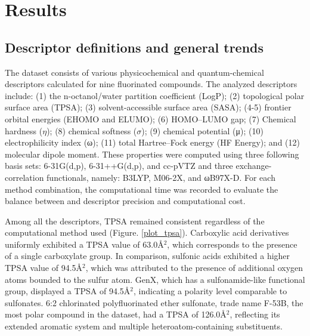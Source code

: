 
\chapter{Results}

\label{Chapter5}


\newcommand{\keyword}[1]{\textbf{#1}}
\newcommand{\tabhead}[1]{\textbf{#1}}
\newcommand{\code}[1]{\texttt{#1}}
\newcommand{\file}[1]{\texttt{\bfseries#1}}
\newcommand{\option}[1]{\texttt{\itshape#1}}
\renewcommand{\figurename}{Figure.}
\renewcommand{\tablename}{Table.}


\section{Descriptor definitions and general trends}

The dataset consists of various physicochemical and quantum-chemical descriptors calculated for nine fluorinated compounds. The analyzed descriptors include: (1) the n-octanol/water partition coefficient (LogP); (2) topological polar surface area (TPSA); (3) solvent-accessible surface area (SASA); (4-5) frontier orbital energies (EHOMO and ELUMO); (6) HOMO–LUMO gap; (7) Chemical hardness ($\eta$); (8) chemical softness ($\sigma$); (9) chemical potential (μ); (10) electrophilicity index (ω); (11) total Hartree–Fock energy (HF Energy); and (12) molecular dipole moment. These properties were computed using three following basis sets: 6-31G(d,p), 6-31++G(d,p), and cc-pVTZ and three exchange-correlation functionals, namely: B3LYP, M06-2X, and ωB97X-D. For each method combination, the computational time was recorded to evaluate the balance between and descriptor precision and computational cost.

Among all the descriptors, TPSA remained consistent regardless of the computational method used (Figure. \ref{plot_tpsa}). Carboxylic acid derivatives uniformly exhibited a TPSA value of 63.0Å$^2$, which corresponds to the presence of a single carboxylate group. In comparison, sulfonic acids exhibited a higher TPSA value of 94.5Å$^2$, which was attributed to the presence of additional oxygen atoms bounded to the sulfur atom. GenX, which has a sulfonamide-like functional group, displayed a TPSA of 94.5Å$^2$, indicating a polarity level comparable to sulfonates. 6:2 chlorinated polyfluorinated ether sulfonate, trade name F-53B, the most polar compound in the dataset, had a TPSA of 126.0Å$^2$, reflecting its extended aromatic system and multiple heteroatom-containing substituents.

